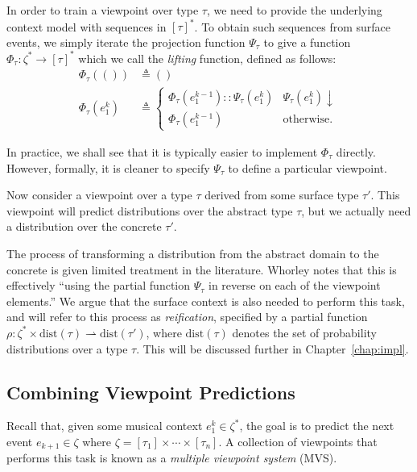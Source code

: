 \documentclass[12pt,a4paper,twoside,openright]{report}
\begin{document}
In order to train a viewpoint over type $\tau$, we need to provide the
underlying context model with sequences in $[\tau]^*$. To obtain such sequences
from surface events, we simply iterate the projection function $\Psi_\tau$ to
give a function $\Phi_\tau : \zeta^* \rightarrow [\tau]^*$ which we call the
\emph{lifting} function, defined as follows:
\begin{align*}
  \Phi_\tau(()) &\triangleq () \\
  \Phi_\tau(e_1^k) &\triangleq \begin{cases}
    \Phi_\tau(e_1^{k-1})::\Psi_\tau(e_1^k) & \Psi_\tau(e_1^k)\downarrow \\
    \Phi_\tau(e_1^{k-1}) & \text{otherwise.}
  \end{cases}
\end{align*}

In practice, we shall see that it is typically easier to implement $\Phi_\tau$
directly. However, formally, it is cleaner to specify $\Psi_\tau$ to define a
particular viewpoint.

Now consider a viewpoint over a type $\tau$ derived from some surface type
$\tau'$. This viewpoint will predict distributions over the abstract type
$\tau$, but we actually need a distribution over the concrete $\tau'$. 

The process of transforming a distribution from the abstract domain to the
concrete is given limited treatment in the literature. Whorley
\cite{whorley2013phd} notes that this is effectively ``using the partial
function $\Psi_\tau$ in reverse on each of the viewpoint elements.'' We argue
that the surface context is also needed to perform this task, and will refer to
this process as \emph{reification}, specified by a partial function $\rho :
\zeta^* \times \mathrm{dist}(\tau) \rightharpoonup \mathrm{dist}(\tau')$, where
$\mathrm{dist}(\tau)$ denotes the set of probability distributions over a type
$\tau$. This will be discussed further in Chapter~\ref{chap:impl}.

\subsection{Combining Viewpoint Predictions}\label{sec:vp-comb}

Recall that, given some musical context $e_1^k \in \zeta^*$, the goal is to
predict the next event $e_{k+1} \in \zeta$ where $\zeta = [\tau_1] \times \cdots
\times [\tau_n]$.  A collection of viewpoints that performs this task is known
as a \emph{multiple viewpoint system} (MVS). 
\end{document}
